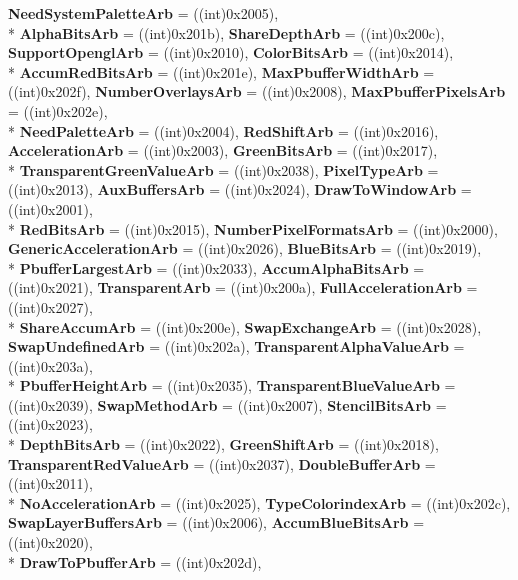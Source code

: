 \begin{DoxyCompactItemize}
{\bfseries Need\-System\-Palette\-Arb} = ((int)0x2005), 
\\*
{\bfseries Alpha\-Bits\-Arb} = ((int)0x201b), 
{\bfseries Share\-Depth\-Arb} = ((int)0x200c), 
{\bfseries Support\-Opengl\-Arb} = ((int)0x2010), 
{\bfseries Color\-Bits\-Arb} = ((int)0x2014), 
\\*
{\bfseries Accum\-Red\-Bits\-Arb} = ((int)0x201e), 
{\bfseries Max\-Pbuffer\-Width\-Arb} = ((int)0x202f), 
{\bfseries Number\-Overlays\-Arb} = ((int)0x2008), 
{\bfseries Max\-Pbuffer\-Pixels\-Arb} = ((int)0x202e), 
\\*
{\bfseries Need\-Palette\-Arb} = ((int)0x2004), 
{\bfseries Red\-Shift\-Arb} = ((int)0x2016), 
{\bfseries Acceleration\-Arb} = ((int)0x2003), 
{\bfseries Green\-Bits\-Arb} = ((int)0x2017), 
\\*
{\bfseries Transparent\-Green\-Value\-Arb} = ((int)0x2038), 
{\bfseries Pixel\-Type\-Arb} = ((int)0x2013), 
{\bfseries Aux\-Buffers\-Arb} = ((int)0x2024), 
{\bfseries Draw\-To\-Window\-Arb} = ((int)0x2001), 
\\*
{\bfseries Red\-Bits\-Arb} = ((int)0x2015), 
{\bfseries Number\-Pixel\-Formats\-Arb} = ((int)0x2000), 
{\bfseries Generic\-Acceleration\-Arb} = ((int)0x2026), 
{\bfseries Blue\-Bits\-Arb} = ((int)0x2019), 
\\*
{\bfseries Pbuffer\-Largest\-Arb} = ((int)0x2033), 
{\bfseries Accum\-Alpha\-Bits\-Arb} = ((int)0x2021), 
{\bfseries Transparent\-Arb} = ((int)0x200a), 
{\bfseries Full\-Acceleration\-Arb} = ((int)0x2027), 
\\*
{\bfseries Share\-Accum\-Arb} = ((int)0x200e), 
{\bfseries Swap\-Exchange\-Arb} = ((int)0x2028), 
{\bfseries Swap\-Undefined\-Arb} = ((int)0x202a), 
{\bfseries Transparent\-Alpha\-Value\-Arb} = ((int)0x203a), 
\\*
{\bfseries Pbuffer\-Height\-Arb} = ((int)0x2035), 
{\bfseries Transparent\-Blue\-Value\-Arb} = ((int)0x2039), 
{\bfseries Swap\-Method\-Arb} = ((int)0x2007), 
{\bfseries Stencil\-Bits\-Arb} = ((int)0x2023), 
\\*
{\bfseries Depth\-Bits\-Arb} = ((int)0x2022), 
{\bfseries Green\-Shift\-Arb} = ((int)0x2018), 
{\bfseries Transparent\-Red\-Value\-Arb} = ((int)0x2037), 
{\bfseries Double\-Buffer\-Arb} = ((int)0x2011), 
\\*
{\bfseries No\-Acceleration\-Arb} = ((int)0x2025), 
{\bfseries Type\-Colorindex\-Arb} = ((int)0x202c), 
{\bfseries Swap\-Layer\-Buffers\-Arb} = ((int)0x2006), 
{\bfseries Accum\-Blue\-Bits\-Arb} = ((int)0x2020), 
\\*
{\bfseries Draw\-To\-Pbuffer\-Arb} = ((int)0x202d), 

\end{DoxyCompactItemize}
